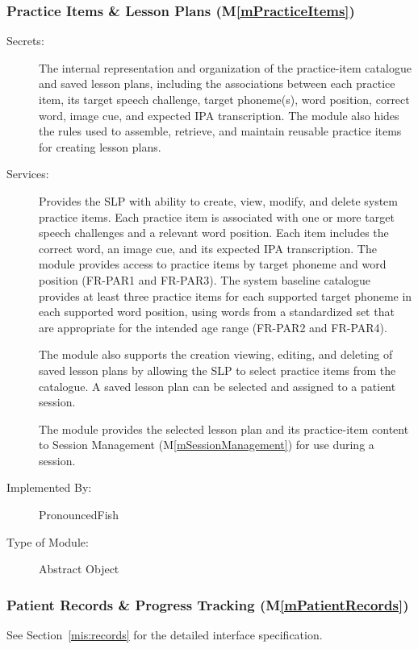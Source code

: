 \documentclass[12pt, titlepage]{article}
\newcommand{\mref}[1]{M\ref{#1}}
\begin{document}
\subsubsection{Practice Items \& Lesson Plans (\mref{mPracticeItems})}
\begin{description}
\item[Secrets:] The internal representation and organization of the practice-item
catalogue and saved lesson plans, including the associations between each
practice item, its target speech challenge, target phoneme(s), word position,
correct word, image cue, and expected IPA transcription. The module also hides
the rules used to assemble, retrieve, and maintain reusable practice items for creating lesson plans.

\item[Services:] Provides the SLP with ability to create, view, modify, and
delete system practice items. Each practice item is associated with one or more target
speech challenges and a relevant word position. Each item includes the correct
word, an image cue, and its expected IPA transcription. The module provides
access to practice items by target phoneme and word position (FR-PAR1 and
FR-PAR3). The system baseline catalogue provides at least three practice items for each
supported target phoneme in each supported word position, using words from a
standardized set that are appropriate for the intended age range (FR-PAR2 and
FR-PAR4).

The module also supports the creation viewing, editing, and deleting of saved
lesson plans by allowing the SLP to select practice items from the catalogue.
A saved lesson plan can be selected and assigned to a patient session. 

The module provides the selected lesson plan and its practice-item content to
Session Management (\mref{mSessionManagement}) for use during a session.

\item[Implemented By:] PronouncedFish
\item[Type of Module:] Abstract Object
\end{description}

\subsubsection{Patient Records \& Progress Tracking (\mref{mPatientRecords})}

See Section~\ref{mis:records} for the detailed interface specification.
\end{document}
